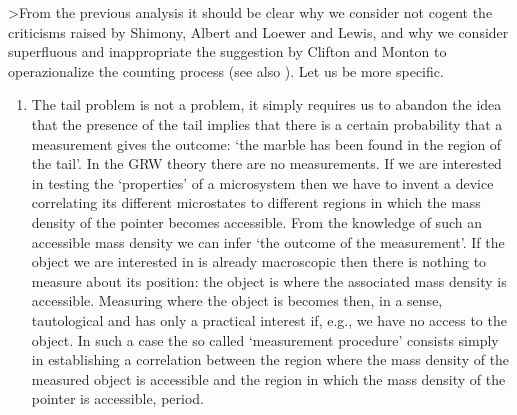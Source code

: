 \documentclass[12pt]{article}
\begin{document}
>From the previous analysis it should be clear why we consider not
cogent the criticisms raised by Shimony, Albert and Loewer and
Lewis, and why we consider superfluous and inappropriate the
suggestion by Clifton and Monton to operazionalize the counting
process (see also \cite{bgsm1,bgsm2,bgsm3}). Let us be more
specific.
\begin{enumerate}
\item The tail problem is not a problem, it simply requires us to
abandon the idea that the presence of the tail implies that there
is a certain probability that a measurement gives the outcome:
`the marble has been found in the region of the tail'. In the GRW
theory there are no measurements. If we are interested in testing
the `properties' of a microsystem then we have to invent a device
correlating its different microstates to different regions in
which the mass density of the pointer becomes accessible. From the
knowledge of such an accessible mass density we can infer `the
outcome of the measurement'.  If the object we are interested in
is already macroscopic then there is nothing to measure about its
position: the object is where the associated mass density is
accessible. Measuring where the object is becomes then, in a
sense, tautological and has only a practical interest if, e.g., we
have no access to the object. In such a case the so called
`measurement procedure' consists simply in establishing a
correlation between the region where the mass density of the
measured object is accessible and the region in which the mass
density of the pointer is accessible, period.


\end{enumerate}
\end{document}
